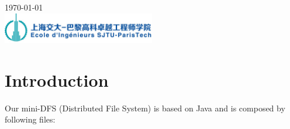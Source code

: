 \documentclass[10pt]{article}
\begin{document}
\begin{titlepage}


{\large \today}\\[2cm] %


\includegraphics[width=0.5\textwidth]{logo_SPEIT.jpg}\\[1cm] %


\vfill %

\end{titlepage}
\indent

\section{Introduction}

Our mini-DFS (Distributed File System) is based on Java and is composed by following files:
\end{document}
